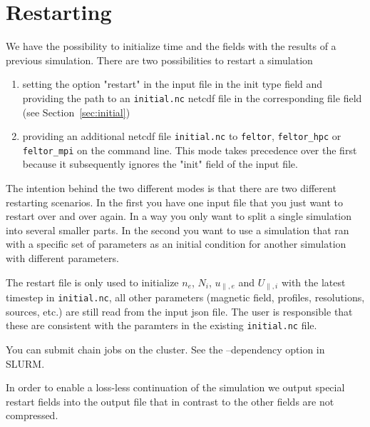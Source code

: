 \section{Restarting} \label{sec:restart_file}
We have the possibility to initialize time and
the fields with the results of a previous simulation.
There are two possibilities to restart a simulation
\begin{enumerate}
    \item setting the option "restart" in the input file in the init type field
        and providing the path to an \texttt{initial.nc} netcdf file in the
        corresponding file field (see Section~\ref{sec:initial})
    \item providing an additional netcdf file \texttt{initial.nc}
        to \texttt{feltor}, \texttt{feltor_hpc} or \texttt{feltor_mpi} on the
        command line. This mode takes precedence over the first because it
        subsequently ignores the "init" field of the input file.
\end{enumerate}
The intention behind the two different modes is that there are two different
restarting scenarios. In the first you have one input file that you just want
to restart over and over again. In a way you only want to split a single
simulation into several smaller parts. In the second you want to use a
simulation that ran with a specific set of parameters as an initial condition
for another simulation with different parameters.
\begin{tcolorbox}[title=Note]
    The restart file is only used to initialize $n_e$, $N_i$, $u_{\parallel,e}$
    and $U_{\parallel,i}$ with the latest timestep in \texttt{initial.nc}, all
    other parameters (magnetic field, profiles, resolutions, sources, etc.)
    are still read from the input json file.  The user is responsible
    that these are consistent with the paramters in the existing
    \texttt{initial.nc} file.
\end{tcolorbox}

\begin{tcolorbox}[title=Note]
    You can submit chain jobs on the cluster. See the --dependency option in SLURM.
\end{tcolorbox}
\begin{tcolorbox}[title=Note]
In order to enable a
loss-less continuation of the simulation we output special restart fields into
the output file that in contrast to the other fields are not compressed.
\end{tcolorbox}


